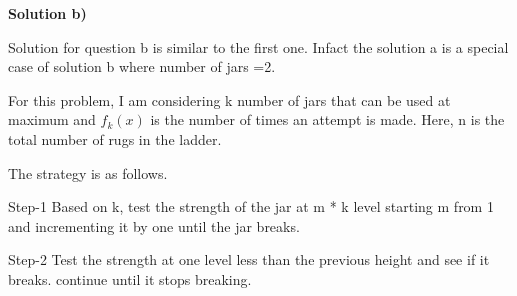 \documentclass[letterpaper,portrait,12pt]{article}
\begin{document}
\begin{flushleft}

\end{flushleft}


\begin{flushleft}
\textbf{Solution b)}
\end{flushleft}


\begin{flushleft}
	Solution for question b is similar to the first one. Infact the solution a is a special case of solution b where number of jars =2.
\end{flushleft}


\begin{flushleft}
For this problem, I am considering k number of jars that can be used at maximum and $f_k(x)$ is the number of times an attempt is made. Here, n is the total number of rugs in the ladder.
\end{flushleft}


\begin{flushleft}

\end{flushleft}


\begin{flushleft}

\end{flushleft}


\begin{flushleft}
The strategy is as follows.
\end{flushleft}


\begin{flushleft}

\end{flushleft}


\begin{flushleft}
Step-1 Based on k, test the strength of the jar at m * k level starting m from 1 and incrementing it by one until the jar breaks.
\end{flushleft}


\begin{flushleft}

\end{flushleft}


\begin{flushleft}
Step-2 Test the strength at one level less than the previous height and see if it breaks. continue until it stops breaking.
\end{flushleft}


\begin{flushleft}

\end{flushleft}
\end{document}
